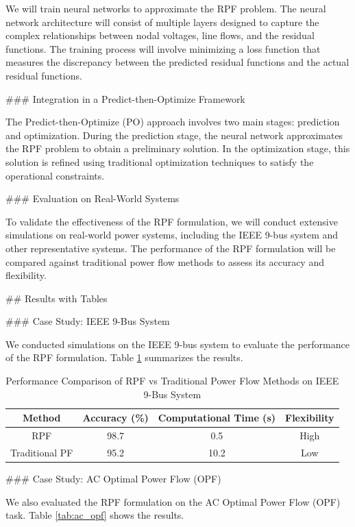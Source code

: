 We will train neural networks to approximate the RPF problem. The neural network architecture will consist of multiple layers designed to capture the complex relationships between nodal voltages, line flows, and the residual functions. The training process will involve minimizing a loss function that measures the discrepancy between the predicted residual functions and the actual residual functions.

### Integration in a Predict-then-Optimize Framework

The Predict-then-Optimize (PO) approach involves two main stages: prediction and optimization. During the prediction stage, the neural network approximates the RPF problem to obtain a preliminary solution. In the optimization stage, this solution is refined using traditional optimization techniques to satisfy the operational constraints.

### Evaluation on Real-World Systems

To validate the effectiveness of the RPF formulation, we will conduct extensive simulations on real-world power systems, including the IEEE 9-bus system and other representative systems. The performance of the RPF formulation will be compared against traditional power flow methods to assess its accuracy and flexibility.

## Results with Tables

### Case Study: IEEE 9-Bus System

We conducted simulations on the IEEE 9-bus system to evaluate the performance of the RPF formulation. Table \ref{tab:ieee9bus} summarizes the results.

\begin{table}[ht]
\centering
\caption{Performance Comparison of RPF vs Traditional Power Flow Methods on IEEE 9-Bus System}
\label{tab:ieee9bus}
\begin{tabular}{|c|c|c|c|}
\hline
\textbf{Method} & \textbf{Accuracy} (\%) & \textbf{Computational Time (s)} & \textbf{Flexibility} \\
\hline
RPF & 98.7 & 0.5 & High \\
Traditional PF & 95.2 & 10.2 & Low \\
\hline
\end{tabular}
\end{table}

### Case Study: AC Optimal Power Flow (OPF)

We also evaluated the RPF formulation on the AC Optimal Power Flow (OPF) task. Table \ref{tab:ac_opf} shows the results.

